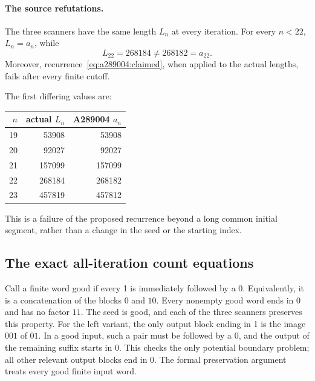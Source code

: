 \documentclass[11pt]{article}
\begin{document}
\paragraph{The source refutations.}
The three scanners have the same length $L_n$ at every iteration. For
every $n<22$, $L_n=a_n$, while
\[
 L_{22}=268184\ne268182=a_{22}.
\]
Moreover, recurrence~\eqref{eq:a289004:claimed}, when applied to the actual
lengths, fails after every finite cutoff.

The first differing values are:
\begin{center}
\begin{tabular}{r|r|r}
$n$ & actual $L_n$ & A289004 $a_n$\\
\hline
19 & 53908 & 53908\\
20 & 92027 & 92027\\
21 & 157099 & 157099\\
22 & 268184 & 268182\\
23 & 457819 & 457812
\end{tabular}
\end{center}
This is a failure of the proposed recurrence beyond a long common initial
segment, rather than a change in the seed or the starting index.

\subsection{The exact all-iteration count equations}

Call a finite word good if every 1 is immediately followed by a 0.
Equivalently, it is a concatenation of the blocks $0$ and $10$.
Every nonempty good word ends in 0 and has no factor $11$.
The seed is good, and each of the three scanners preserves this property.
For the left variant, the only output block ending in 1 is the image
$001$ of $01$. In a good input, such a pair must be followed by a 0,
and the output of the remaining suffix starts in 0. This checks the only
potential boundary problem; all other relevant output blocks end in 0.
The formal preservation argument treats every good finite input word.
\end{document}
